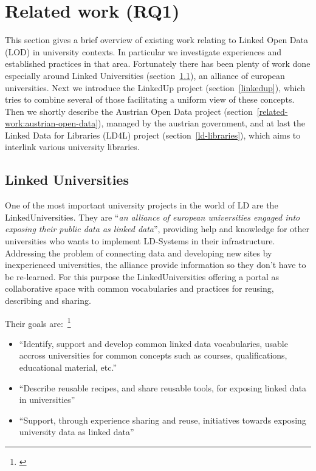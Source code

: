 \section{Related work (RQ1)}
This section gives a brief overview of existing work relating to Linked Open Data (LOD) in university contexts. In particular we investigate experiences and established practices in that area. Fortunately there has been plenty of work done especially around Linked Universities (section~\ref{linkeduniversities}), an alliance of european universities. Next we introduce the LinkedUp project (section~\ref{linkedup}), which tries to combine several of those facilitating a uniform view of these concepts. Then we shortly describe the Austrian Open Data project (section~\ref{related-work:austrian-open-data}), managed by the austrian government, and at last the Linked Data for Libraries (LD4L) project (section~\ref{ld-libraries}), which aims to interlink various university libraries.

\subsection{Linked Universities}\label{linkeduniversities}
One of the most important university projects in the world of LD are the LinkedUniversities. They are ``\textit{an alliance of european universities engaged into exposing their public data as linked data}''\citet{url:linkeduniversities}, providing help and knowledge for other universities who wants to implement LD-Systems in their infrastructure. Addressing the problem of connecting data and developing new sites by inexperienced universities, the alliance provide information so they don't have to be re-learned. For this purpose the LinkedUniversities offering a portal as collaborative space with common vocabularies and practices for reusing, describing and sharing.

Their goals are:~\footnote{\citet{url:linkeduniversities}}

\begin{itemize}
\item ``Identify, support and develop common linked data vocabularies, usable accross universities for common concepts such as courses, qualifications, educational material, etc.''
\item ``Describe reusable recipes, and share reusable tools, for exposing linked data in universities''
\item ``Support, through experience sharing and reuse, initiatives towards exposing university data as linked data''
\end{itemize}

